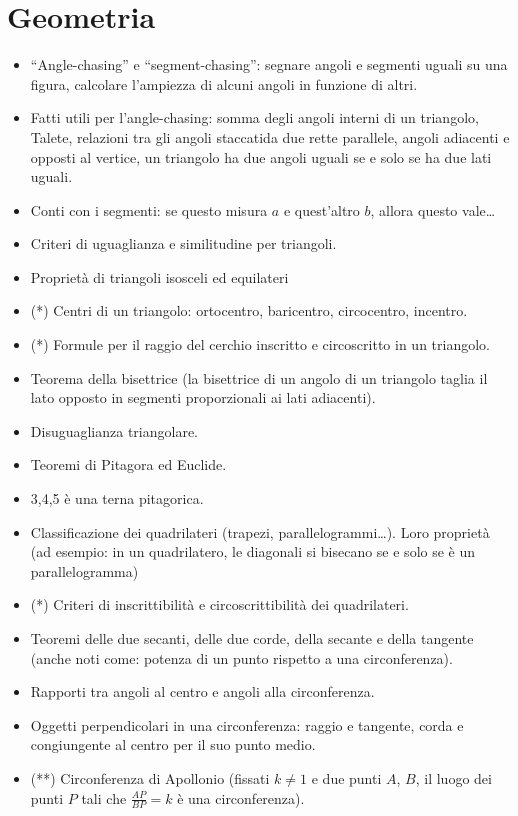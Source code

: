\documentclass[a4paper,10pt]{paper}
\renewcommand{\star}{(*)}
\newcommand{\sstar}{(**)}
\begin{document}
\section{Geometria}
\begin{itemize}
 \item ``Angle-chasing'' e ``segment-chasing'': segnare angoli e segmenti uguali su una figura, calcolare l'ampiezza di alcuni angoli in funzione di altri.
 \item Fatti utili per l'angle-chasing: somma degli angoli interni di un triangolo, Talete, relazioni tra gli angoli staccatida due rette parallele, angoli adiacenti e opposti al vertice, un triangolo ha due angoli uguali se e solo se ha due lati uguali.
 \item Conti con i segmenti: se questo misura $a$ e quest'altro $b$, allora questo vale\dots
 \item Criteri di uguaglianza e similitudine per triangoli.
 \item Proprietà di triangoli isosceli ed equilateri
 \item \star{} Centri di un triangolo: ortocentro, baricentro, circocentro, incentro.
 \item \star{} Formule per il raggio del cerchio inscritto e circoscritto in un triangolo.
 \item Teorema della bisettrice (la bisettrice di un angolo di un triangolo taglia il lato opposto in segmenti proporzionali ai lati adiacenti).
 \item Disuguaglianza triangolare.
 \item Teoremi di Pitagora ed Euclide.
 \item 3,4,5 è una terna pitagorica.
 \item Classificazione dei quadrilateri (trapezi, parallelogrammi\dots). Loro proprietà (ad esempio: in un quadrilatero, le diagonali si bisecano se e solo se è un parallelogramma)
 \item \star{} Criteri di inscrittibilità e circoscrittibilità dei quadrilateri.
 \item Teoremi delle due secanti, delle due corde, della secante e della tangente (anche noti come: potenza di un punto rispetto a una circonferenza).
 \item Rapporti tra angoli al centro e angoli alla circonferenza.
 \item Oggetti perpendicolari in una circonferenza: raggio e tangente, corda e congiungente al centro per il suo punto medio.
 \item \sstar{} Circonferenza di Apollonio (fissati $k\neq 1$ e due punti $A$, $B$, il luogo dei punti $P$ tali che $\frac{AP}{BP}=k$ è una circonferenza).

\end{itemize}
\end{document}
